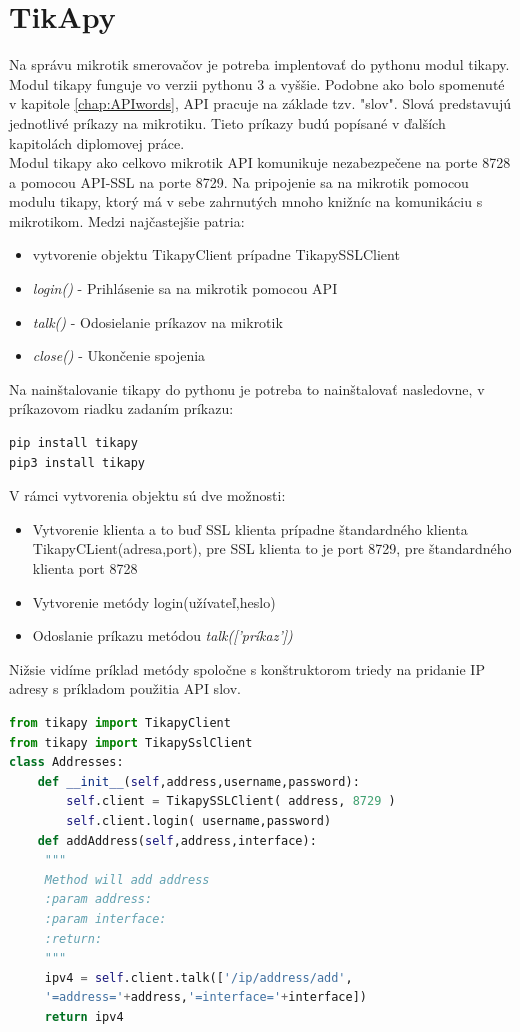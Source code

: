 \section{TikApy}
\label{sec:tikapy}
Na správu mikrotik smerovačov je potreba implentovať do pythonu modul tikapy\cite{tikapy}. Modul tikapy funguje vo verzii pythonu 3 a vyššie. Podobne ako bolo spomenuté v kapitole \ref{chap:APIwords}, API pracuje na základe tzv. "slov". Slová predstavujú jednotlivé príkazy na mikrotiku. Tieto príkazy budú popísané v ďalších kapitolách diplomovej práce.\\
Modul tikapy ako celkovo mikrotik API komunikuje nezabezpečene na porte 8728 a pomocou API-SSL na porte 8729. Na pripojenie sa na mikrotik pomocou modulu tikapy, ktorý má v sebe zahrnutých mnoho knižníc na komunikáciu s mikrotikom. Medzi najčastejšie patria:\begin{itemize}
\item vytvorenie objektu TikapyClient prípadne TikapySSLClient
\item \textit{login()} - Prihlásenie sa na mikrotik pomocou API
\item \textit{talk()} - Odosielanie príkazov na mikrotik
\item  \textit{close()} - Ukončenie spojenia
\end{itemize} 
Na nainštalovanie tikapy do pythonu je potreba to nainštalovať nasledovne, v príkazovom riadku zadaním príkazu:
\begin{lstlisting}[language=python, frame=single, caption=Inštalácia tikapy,  captionpos=b, basicstyle=\footnotesize]
pip install tikapy
pip3 install tikapy
\end{lstlisting}
\newpage
V rámci vytvorenia objektu sú dve možnosti:\begin{itemize}
\item Vytvorenie klienta a to buď SSL klienta prípadne štandardného klienta TikapyCLient(adresa,port), pre SSL klienta to je port 8729, pre štandardného klienta port 8728
\item Vytvorenie metódy login(užívateľ,heslo)
\item Odoslanie príkazu metódou \textit{talk(['príkaz'])} 
\end{itemize}
Nižsie vidíme príklad metódy spoločne s konštruktorom triedy na pridanie IP adresy s príkladom použitia API slov.
\begin{lstlisting}[language=python, frame=single, caption=Príklad použitia tikapy,  captionpos=b, basicstyle=\footnotesize]
from tikapy import TikapyClient
from tikapy import TikapySslClient
class Addresses:
    def __init__(self,address,username,password):
        self.client = TikapySSLClient( address, 8729 )
        self.client.login( username,password)
    def addAddress(self,address,interface):
     """
     Method will add address
     :param address:
     :param interface:
     :return:
     """
     ipv4 = self.client.talk(['/ip/address/add',
     '=address='+address,'=interface='+interface])
     return ipv4
\end{lstlisting} 





